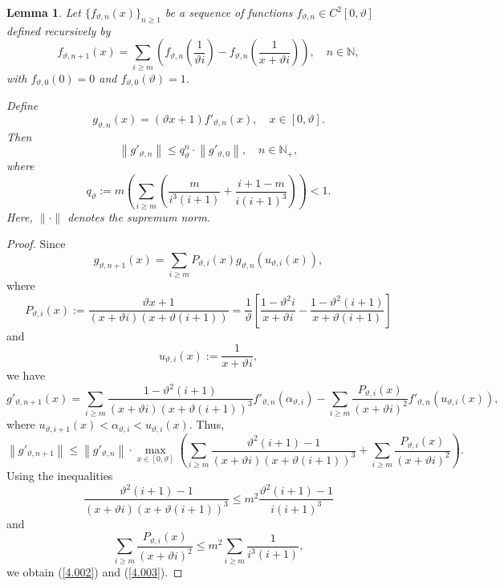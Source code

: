 \documentclass[final,1p,times]{elsarticle}
\newtheorem{lemma}[theorem]{Lemma}
\numberwithin{equation}{section}
\begin{document}
\begin{lemma} \label{lema4.2a}
Let \( \{ f_{\vartheta,n}(x) \}_{n \geq 1} \) be a sequence of functions \( f_{\vartheta,n} \in C^2[0, \vartheta] \) defined recursively by
\[
f_{\vartheta,n+1}(x) = \sum_{i \geq m} \left( f_{\vartheta,n} \left( \frac{1}{\vartheta i} \right) - f_{\vartheta,n} \left( \frac{1}{x + \vartheta i} \right) \right), \quad n \in \mathbb{N},
\]
with \( f_{\vartheta, 0}(0) = 0 \) and \( f_{\vartheta, 0}(\vartheta) = 1 \).

Define
\begin{equation} 
g_{\vartheta, n}(x) = (\vartheta x + 1) f'_{\vartheta, n}(x), \quad x \in [0, \vartheta]. \label{4.001}
\end{equation}
Then
\begin{equation} \label{4.002}
\left\| g'_{\vartheta, n} \right\| \leq q^n_{\vartheta} \cdot \left\| g'_{\vartheta, 0} \right\|, \quad n \in \mathbb{N}_+,
\end{equation}
where
\begin{equation} \label{4.003}
q_{\vartheta} := m \left( \sum_{i \geq m} \left( \frac{m}{i^3(i+1)} + \frac{i+1-m}{i(i+1)^3} \right) \right) < 1.
\end{equation}
Here, \( \| \cdot \| \) denotes the supremum norm.
\end{lemma}

\begin{proof}
Since
\[
g_{\vartheta,n+1}(x) = \sum_{i \geq m} P_{\vartheta,i}(x) g_{\vartheta,n}\left( u_{\vartheta,i}(x) \right),
\]
where
\[
P_{\vartheta,i}(x) := \frac{\vartheta x + 1}{(x + \vartheta i)(x + \vartheta (i+1))} = \frac{1}{\vartheta} \left[ \frac{1 - \vartheta^2 i}{x + \vartheta i} - \frac{1 - \vartheta^2 (i+1)}{x + \vartheta (i+1)} \right]
\]
and
\[
u_{\vartheta,i}(x) := \frac{1}{x + \vartheta i},
\]
we have
\[
g'_{\vartheta,n+1}(x) = \sum_{i \geq m} \frac{1 - \vartheta^2 (i+1)}{(x + \vartheta i)(x + \vartheta (i+1))^3} f'_{\vartheta,n}(\alpha_{\vartheta,i}) - \sum_{i \geq m} \frac{P_{\vartheta,i}(x)}{(x + \vartheta i)^2} f'_{\vartheta,n}(u_{\vartheta,i}(x)),
\]
where \( u_{\vartheta,i+1}(x) < \alpha_{\vartheta,i} < u_{\vartheta,i}(x) \).
Thus,
\[
\left\| g'_{\vartheta, n+1} \right\| \leq \left\| g'_{\vartheta, n} \right\| \cdot \max_{x \in [0, \vartheta]} \left( \sum_{i \geq m} \frac{\vartheta^2 (i+1) - 1}{(x + \vartheta i)(x + \vartheta (i+1))^3} + \sum_{i \geq m} \frac{P_{\vartheta,i}(x)}{(x + \vartheta i)^2} \right).
\]
Using the inequalities
\[
\frac{\vartheta^2 (i+1) - 1}{(x + \vartheta i)(x + \vartheta (i+1))^3} \leq m^2 \frac{\vartheta^2 (i+1) - 1}{i(i+1)^3}
\]
and
\[
\sum_{i \geq m} \frac{P_{\vartheta,i}(x)}{(x + \vartheta i)^2} \leq m^2 \sum_{i \geq m} \frac{1}{i^3(i+1)},
\]
we obtain (\ref{4.002}) and (\ref{4.003}).
\end{proof}
\end{document}
